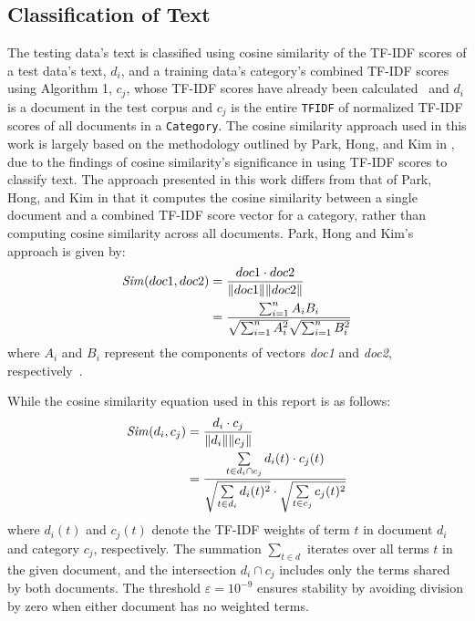 \documentclass[conference]{IEEEtran}
\newcommand{\code}[1]{\lstinline[basicstyle=\ttfamily]|#1|}
\begin{document}
\subsection{Classification of Text}
The testing data's text is classified using cosine similarity of the TF-IDF scores of a test data's text, $d_i$, and a training data's category's combined TF-IDF scores using Algorithm 1, $c_j$, whose TF-IDF scores have already been calculated~\cite{b1} and $d_i$ is a document in the test corpus and $c_j$ is the entire \code{TFIDF} of normalized TF-IDF scores of all documents in a \code{Category}. The cosine similarity approach used in this work is largely based on the methodology outlined by Park, Hong, and Kim in \cite{b2}, due to the findings of cosine similarity's significance in using TF-IDF scores to classify text. The approach presented in this work differs from that of Park, Hong, and Kim in that it computes the cosine similarity between a single document and a combined TF-IDF score vector for a category, rather than computing cosine similarity across all documents. Park, Hong and Kim's approach is given by:
\begin{equation}
\begin{aligned}    
\text{\textit{Sim}}(doc1, doc2) &= \frac{doc1 \cdot doc2}{\|doc1\| \|doc2\|} \\
                       &= \frac{\sum_{i=1}^{n} A_i B_i}{\sqrt{\sum_{i=1}^{n} A_i^2} \sqrt{\sum_{i=1}^{n} B_i^2}}
\end{aligned}
\end{equation}
where $A_i$ and $B_i$ represent the components of vectors \textit{doc1} and \textit{doc2}, respectively~\cite{b2}.

While the cosine similarity equation used in this report is as follows: 
\begin{equation}
\begin{aligned}
\text{\textit{Sim}}(d_i, c_j) &= \frac{d_i \cdot c_j}{\|d_i\| \|c_j\|} \\
                     &= \frac{ \sum\limits_{t \in d_i \cap c_j} d_i(t) \cdot c_j(t) }
        { \sqrt{ \sum\limits_{t \in d_i} d_i(t)^2 } \cdot \sqrt{ \sum\limits_{t \in c_j} c_j(t)^2 } } \label{eq:cosine-sim} \\
\end{aligned}
\end{equation}
where $d_i(t)$ and $c_j(t)$ denote the TF-IDF weights of term $t$ in document $d_i$ and category $c_j$, respectively. The summation $\sum_{t \in d}$ iterates over all terms $t$ in the given document, and the intersection $d_i \cap c_j$ includes only the terms shared by both documents. The threshold $\varepsilon = 10^{-9}$ ensures stability by avoiding division by zero when either document has no weighted terms.
\end{document}
